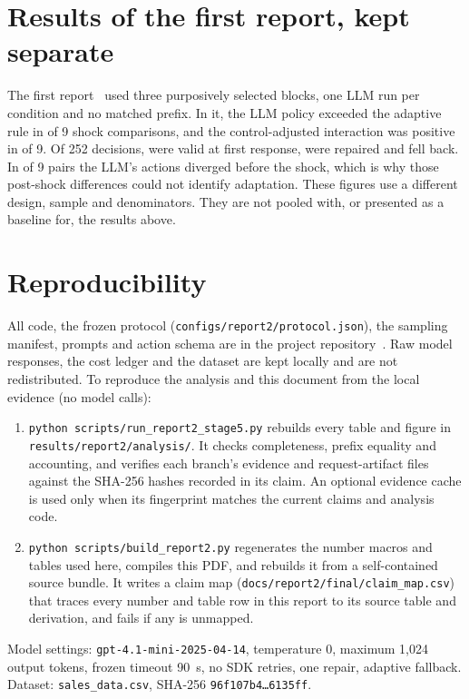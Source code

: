 \documentclass[runningheads]{llncs}
\begin{document}
\section{Results of the first report, kept separate}\label{app:legacy}

The first report~\cite{report1} used three purposively selected blocks, one LLM run per condition and no matched prefix. In it, the LLM policy exceeded the adaptive rule in  of 9 shock comparisons, and the control-adjusted interaction was positive in  of 9. Of 252 decisions,  were valid at first response,  were repaired and  fell back. In  of 9 pairs the LLM's actions diverged before the shock, which is why those post-shock differences could not identify adaptation. These figures use a different design, sample and denominators. They are not pooled with, or presented as a baseline for, the results above.

\section{Reproducibility}\label{app:repro}

All code, the frozen protocol (\texttt{configs/report2/protocol.json}), the sampling manifest, prompts and action schema are in the project repository~\cite{project_repo}. Raw model responses, the cost ledger and the dataset are kept locally and are not redistributed. To reproduce the analysis and this document from the local evidence (no model calls):
\begin{enumerate}
\item \texttt{python scripts/run\_report2\_stage5.py} rebuilds every table and figure in \texttt{results/report2/analysis/}. It checks completeness, prefix equality and accounting, and verifies each branch's evidence and request-artifact files against the SHA-256 hashes recorded in its claim. An optional evidence cache is used only when its fingerprint matches the current claims and analysis code.
\item \texttt{python scripts/build\_report2.py} regenerates the number macros and tables used here, compiles this PDF, and rebuilds it from a self-contained source bundle. It writes a claim map (\texttt{docs/report2/final/claim\_map.csv}) that traces every number and table row in this report to its source table and derivation, and fails if any is unmapped.
\end{enumerate}
Model settings: \texttt{gpt-4.1-mini-2025-04-14}, temperature 0, maximum 1{,}024 output tokens, frozen timeout 90~s, no SDK retries, one repair, adaptive fallback. Dataset: \texttt{sales\_data.csv}, SHA-256 \texttt{96f107b4\ldots6135ff}.
\end{document}
